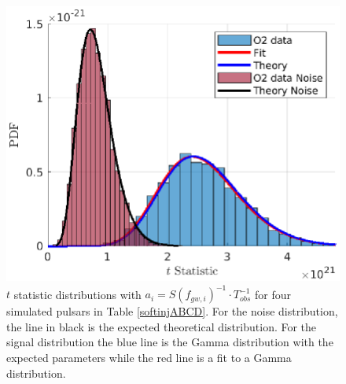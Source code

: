 \documentclass[11pt,a4paper,final]{iopart}
\begin{document}
\begin{figure}
\centering
        \includegraphics[scale=0.8]{ABCD2.eps}
    \caption{$t$ statistic distributions with $a_i=S(f_{gw,i})^{-1}\cdot T_{obs}^{-1}$ for four simulated pulsars in Table \ref{softinjABCD}. For the noise distribution, the line in black is the expected theoretical distribution. For the signal distribution the blue line is the Gamma distribution with the expected parameters while the red line is a fit to a Gamma distribution.}
    \vspace{-10pt}
    \label{tABCD}
\end{figure}
\end{document}
